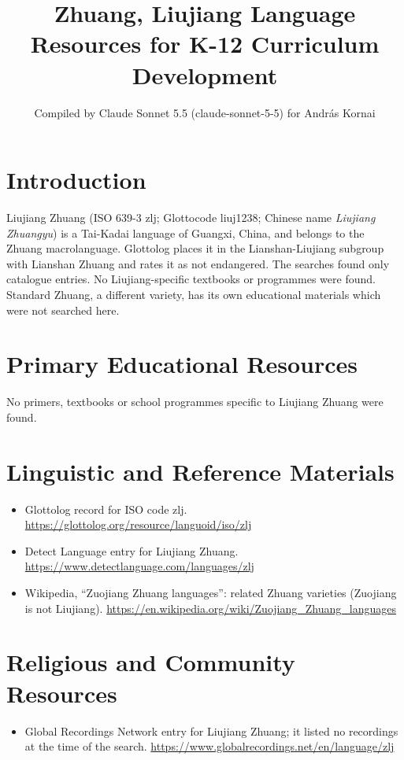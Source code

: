 \documentclass[12pt]{article}
\title{Zhuang, Liujiang Language Resources for K-12 Curriculum Development}
\author{Compiled by Claude Sonnet 5.5 (claude-sonnet-5-5) for Andr\'as Kornai}
\date{}
\begin{document}
\maketitle

\section{Introduction}
Liujiang Zhuang (ISO 639-3 zlj; Glottocode liuj1238; Chinese name \emph{Liujiang Zhuangyu}) is a Tai-Kadai language of Guangxi, China, and belongs to the Zhuang macrolanguage. Glottolog places it in the Lianshan-Liujiang subgroup with Lianshan Zhuang and rates it as not endangered. The searches found only catalogue entries. No Liujiang-specific textbooks or programmes were found. Standard Zhuang, a different variety, has its own educational materials which were not searched here.

\section{Primary Educational Resources}
No primers, textbooks or school programmes specific to Liujiang Zhuang were found.

\section{Linguistic and Reference Materials}
\begin{itemize}
\item Glottolog record for ISO code zlj. \url{https://glottolog.org/resource/languoid/iso/zlj}
\item Detect Language entry for Liujiang Zhuang. \url{https://www.detectlanguage.com/languages/zlj}
\item Wikipedia, ``Zuojiang Zhuang languages'': related Zhuang varieties (Zuojiang is not Liujiang). \url{https://en.wikipedia.org/wiki/Zuojiang_Zhuang_languages}
\end{itemize}

\section{Religious and Community Resources}
\begin{itemize}
\item Global Recordings Network entry for Liujiang Zhuang; it listed no recordings at the time of the search. \url{https://www.globalrecordings.net/en/language/zlj}
\end{itemize}
\end{document}
